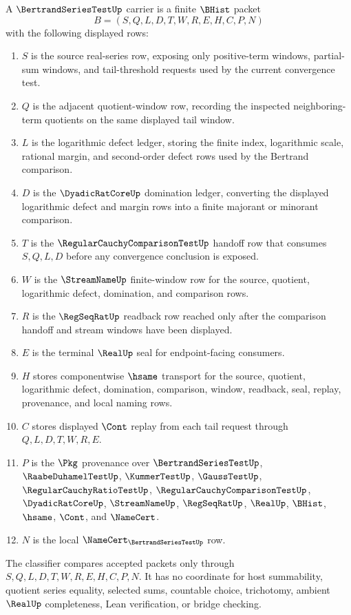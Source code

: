\begin{definition}\label{def:bertrand-series-test-carrier}
A $\BertrandSeriesTestUp$ carrier is a finite $\BHist$ packet
$$
B=(S,Q,L,D,T,W,R,E,H,C,P,N)
$$
with the following displayed rows:
\begin{enumerate}
\item $S$ is the source real-series row, exposing only positive-term windows, partial-sum windows, and tail-threshold requests used by the current convergence test.
\item $Q$ is the adjacent quotient-window row, recording the inspected neighboring-term quotients on the same displayed tail window.
\item $L$ is the logarithmic defect ledger, storing the finite index, logarithmic scale, rational margin, and second-order defect rows used by the Bertrand comparison.
\item $D$ is the $\DyadicRatCoreUp$ domination ledger, converting the displayed logarithmic defect and margin rows into a finite majorant or minorant comparison.
\item $T$ is the $\RegularCauchyComparisonTestUp$ handoff row that consumes $S,Q,L,D$ before any convergence conclusion is exposed.
\item $W$ is the $\StreamNameUp$ finite-window row for the source, quotient, logarithmic defect, domination, and comparison rows.
\item $R$ is the $\RegSeqRatUp$ readback row reached only after the comparison handoff and stream windows have been displayed.
\item $E$ is the terminal $\RealUp$ seal for endpoint-facing consumers.
\item $H$ stores componentwise $\hsame$ transport for the source, quotient, logarithmic defect, domination, comparison, window, readback, seal, replay, provenance, and local naming rows.
\item $C$ stores displayed $\Cont$ replay from each tail request through $Q,L,D,T,W,R,E$.
\item $P$ is the $\Pkg$ provenance over $\BertrandSeriesTestUp$, $\RaabeDuhamelTestUp$, $\KummerTestUp$, $\GaussTestUp$, $\RegularCauchyRatioTestUp$, $\RegularCauchyComparisonTestUp$, $\DyadicRatCoreUp$, $\StreamNameUp$, $\RegSeqRatUp$, $\RealUp$, $\BHist$, $\hsame$, $\Cont$, and $\NameCert$.
\item $N$ is the local $\NameCert_{\BertrandSeriesTestUp}$ row.
\end{enumerate}
The classifier compares accepted packets only through $S,Q,L,D,T,W,R,E,H,C,P,N$. It has no coordinate for host summability, quotient series equality, selected sums, countable choice, trichotomy, ambient $\RealUp$ completeness, Lean verification, or bridge checking.
\end{definition}

